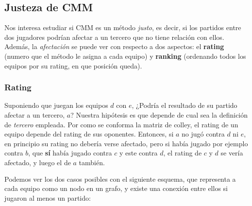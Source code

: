 \documentclass[a4paper]{article}
\begin{document}
\subsection{Justeza de CMM}

Nos interesa estudiar si CMM es un método \textit{justo}, es decir, si los partidos entre dos jugadores podrían afectar a un tercero que no tiene relación con ellos. Además, la \textit{afectación} se puede ver con respecto a dos aspectos: el \textbf{rating} (numero que el método le asigna a cada equipo) y \textbf{ranking} (ordenando todos los equipos por su rating, en que posición queda).

\subsubsection{Rating}

Suponiendo que juegan los equipos $d$ con $e$, ¿Podría el resultado de su partido afectar a un tercero, $a$? Nuestra hipótesis es que depende de cual sea la definición de \textit{tercero} empleada.
Por como se conforma la matriz de colley, el rating de un equipo depende del rating de sus oponentes. Entonces, si $a$ no jugó contra $d$ ni $e$, en principio su rating no debería verse afectado, pero si había jugado por ejemplo contra $b$, que \textbf{sí} había jugado contra $c$ y este contra $d$, el rating de $c$ y $d$ se vería afectado, y luego el de $a$ también.

Podemos ver los dos casos posibles con el siguiente esquema, que representa a cada equipo como un nodo en un grafo, y existe una conexión entre ellos si jugaron al menos un partido:
\end{document}
